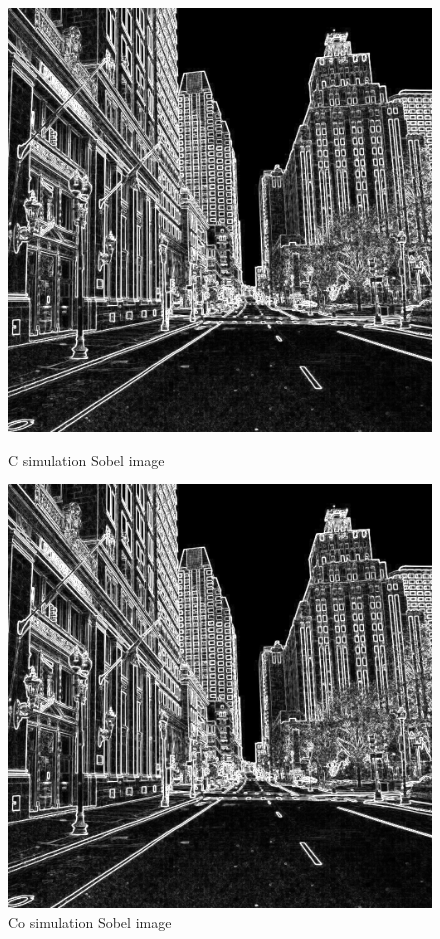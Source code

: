 \begin{figure}[tb!]
\centering
    \begin{minipage}[b]{0.47\textwidth}
        \centering
        \includegraphics[width=\textwidth]{images/validation/c_street1024.png}
        \caption{C simulation Sobel image}
        \label{fig:c_street1}
    \end{minipage}
\hspace{0.5cm}
    \begin{minipage}[b]{0.47\textwidth}
        \centering
        \includegraphics[width=\textwidth]{images/validation/co_street1024.png}
        \caption{Co simulation Sobel image}
        \label{fig:co_street0}
    \end{minipage}
\end{figure}

